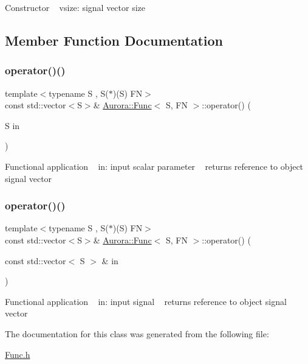 Constructor ~\newline
vsize\+: signal vector size 

\subsection{Member Function Documentation}
\mbox{\label{class_aurora_1_1_func_a90363ee6e98044131fdceb8ce9bcd4d6}} 
\subsubsection{\texorpdfstring{operator()()}{operator()()}\hspace{0.1cm}{\footnotesize\ttfamily [1/2]}}
{\footnotesize\ttfamily template$<$typename S , S($\ast$)(\+S) FN$>$ \\
const std\+::vector$<$S$>$\& \hyperlink{class_aurora_1_1_func}{Aurora\+::\+Func}$<$ S, FN $>$\+::operator() (\begin{DoxyParamCaption}\item[{S}]{in }\end{DoxyParamCaption})\hspace{0.3cm}{\ttfamily [inline]}}

Functional application ~\newline
in\+: input scalar parameter ~\newline
returns reference to object signal vector \mbox{\label{class_aurora_1_1_func_aa7664032aef8be96cdfd33b968a1f226}} 
\subsubsection{\texorpdfstring{operator()()}{operator()()}\hspace{0.1cm}{\footnotesize\ttfamily [2/2]}}
{\footnotesize\ttfamily template$<$typename S , S($\ast$)(\+S) FN$>$ \\
const std\+::vector$<$S$>$\& \hyperlink{class_aurora_1_1_func}{Aurora\+::\+Func}$<$ S, FN $>$\+::operator() (\begin{DoxyParamCaption}\item[{const std\+::vector$<$ S $>$ \&}]{in }\end{DoxyParamCaption})\hspace{0.3cm}{\ttfamily [inline]}}

Functional application ~\newline
in\+: input signal ~\newline
returns reference to object signal vector 

The documentation for this class was generated from the following file\+:\begin{DoxyCompactItemize}
\item 
\hyperlink{_func_8h}{Func.\+h}\end{DoxyCompactItemize}
